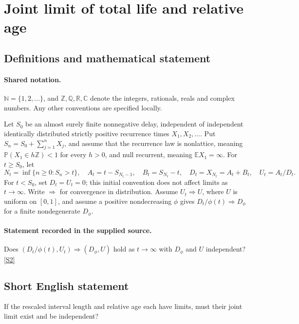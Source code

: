 \documentclass[11pt]{article}
\newcommand{\sref}[2]{\hyperlink{source:#1:#2}{[S#2]}}
\begin{document}
\section{Joint limit of total life and relative age}\label{statement}

\subsection{Definitions and mathematical statement}

\paragraph{Shared notation.}$\mathbb N=\{1,2,\ldots\}$, and $\mathbb Z,\mathbb Q,\mathbb R,\mathbb C$ denote the integers, rationals, reals and complex numbers. Any other conventions are specified locally.


Let $S_0$ be an almost surely finite nonnegative delay, independent of independent identically distributed strictly positive recurrence times $X_1,X_2,\ldots$. Put $S_n=S_0+\sum_{j=1}^nX_j$, and assume that the recurrence law is nonlattice, meaning $\mathbb P(X_1\in h\mathbb Z)<1$ for every $h>0$, and null recurrent, meaning $\mathbb E X_1=\infty$. For $t\ge S_0$, let
\[N_t=\inf\{n\ge0:S_n>t\},\quad A_t=t-S_{N_t-1},\quad B_t=S_{N_t}-t,\quad D_t=X_{N_t}=A_t+B_t,\quad U_t=A_t/D_t.\]
For $t<S_0$, set $D_t=U_t=0$; this initial convention does not affect limits as $t\to\infty$. Write $\Rightarrow$ for convergence in distribution. Assume $U_t\Rightarrow U$, where $U$ is uniform on $[0,1]$, and assume a positive nondecreasing $\phi$ gives $D_t/\phi(t)\Rightarrow D_\phi$ for a finite nondegenerate $D_\phi$.
\paragraph{Statement recorded in the supplied source.}
Does $(D_t/\phi(t),U_t)\Rightarrow(D_\phi,U)$ hold as $t\to\infty$ with $D_\phi$ and $U$ independent? \sref{statement}{2}
\subsection{Short English statement}
If the rescaled interval length and relative age each have limits, must their joint limit exist and be independent?
\end{document}
